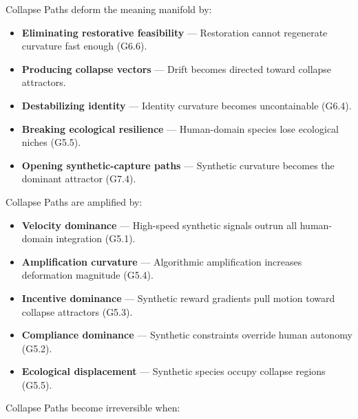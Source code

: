 \medskip

\noindent Collapse Paths deform the meaning manifold by:

\begin{itemize}[leftmargin=1.2cm]
    \item \textbf{Eliminating restorative feasibility} — Restoration cannot
    regenerate curvature fast enough (G6.6).

    \item \textbf{Producing collapse vectors} — Drift becomes directed toward
    collapse attractors.

    \item \textbf{Destabilizing identity} — Identity curvature becomes
    uncontainable (G6.4).

    \item \textbf{Breaking ecological resilience} — Human-domain species lose
    ecological niches (G5.5).

    \item \textbf{Opening synthetic-capture paths} — Synthetic curvature becomes
    the dominant attractor (G7.4).
\end{itemize}

\medskip

\noindent Collapse Paths are amplified by:

\begin{itemize}[leftmargin=1.2cm]
    \item \textbf{Velocity dominance} — High-speed synthetic signals outrun all
    human-domain integration (G5.1).

    \item \textbf{Amplification curvature} — Algorithmic amplification increases
    deformation magnitude (G5.4).

    \item \textbf{Incentive dominance} — Synthetic reward gradients pull motion
    toward collapse attractors (G5.3).

    \item \textbf{Compliance dominance} — Synthetic constraints override human
    autonomy (G5.2).

    \item \textbf{Ecological displacement} — Synthetic species occupy collapse
    regions (G5.5).
\end{itemize}

\medskip

\noindent Collapse Paths become irreversible when:

